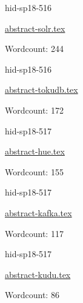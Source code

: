 

\begin{IU}

hid-sp18-516

\href{https://github.com/cloudmesh-community/hid-sp18-516/blob/master//technology/abstract-solr.tex}{abstract-solr.tex}

 

Wordcount: 244

\end{IU}



\begin{IU}

hid-sp18-516

\href{https://github.com/cloudmesh-community/hid-sp18-516/blob/master//technology/abstract-tokudb.tex}{abstract-tokudb.tex}

 

Wordcount: 172

\end{IU}



\begin{IU}

hid-sp18-517

\href{https://github.com/cloudmesh-community/hid-sp18-517/blob/master//technology/abstract-hue.tex}{abstract-hue.tex}

 

Wordcount: 155

\end{IU}



\begin{IU}

hid-sp18-517

\href{https://github.com/cloudmesh-community/hid-sp18-517/blob/master//technology/abstract-kafka.tex}{abstract-kafka.tex}

 

Wordcount: 117

\end{IU}



\begin{IU}

hid-sp18-517

\href{https://github.com/cloudmesh-community/hid-sp18-517/blob/master//technology/abstract-kudu.tex}{abstract-kudu.tex}

 

Wordcount: 86

\end{IU}


